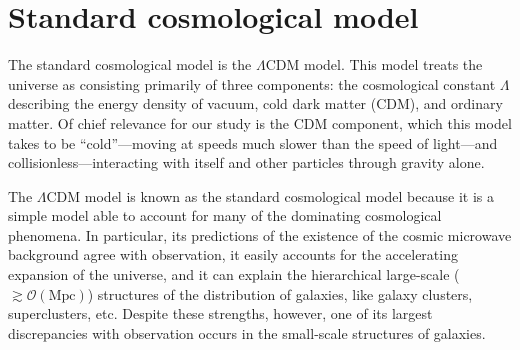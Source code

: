 \section{Standard cosmological model}
The standard cosmological model is the $\Lambda$CDM model. This model treats
the universe as consisting primarily of three components: the cosmological
constant $\Lambda$ describing the energy density of vacuum, cold dark matter
(CDM), and ordinary matter. Of chief relevance for our study is the CDM
component, which this model takes to be ``cold''---moving at speeds much
slower than the speed of light---and collisionless---interacting with itself
and other particles through gravity alone.

The $\Lambda$CDM model is known as the standard cosmological model because it
is a simple model able to account for many of the dominating cosmological
phenomena. In particular, its predictions of the existence of the cosmic
microwave background agree with observation, it easily accounts for the
accelerating expansion of the universe, and it can explain the hierarchical
large-scale ($\gtrsim \mathcal{O}(\text{Mpc})$) structures of the
distribution of galaxies, like galaxy clusters, superclusters, etc. Despite
these strengths, however, one of its largest discrepancies with observation
occurs in the small-scale structures of galaxies.

